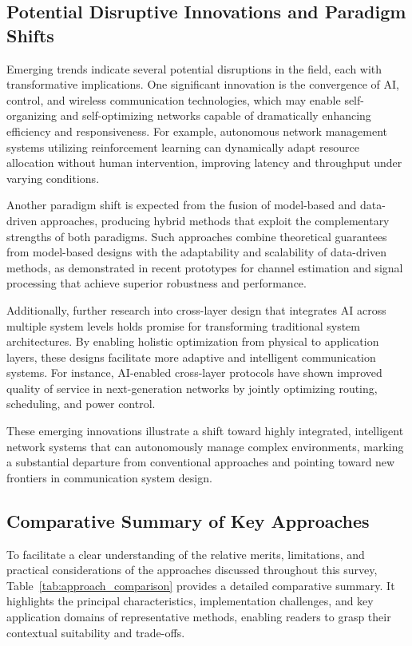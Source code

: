 \documentclass[sigconf]{acmart}
\begin{document}
\subsection{Potential Disruptive Innovations and Paradigm Shifts}

Emerging trends indicate several potential disruptions in the field, each with transformative implications. One significant innovation is the convergence of AI, control, and wireless communication technologies, which may enable self-organizing and self-optimizing networks capable of dramatically enhancing efficiency and responsiveness. For example, autonomous network management systems utilizing reinforcement learning can dynamically adapt resource allocation without human intervention, improving latency and throughput under varying conditions.

Another paradigm shift is expected from the fusion of model-based and data-driven approaches, producing hybrid methods that exploit the complementary strengths of both paradigms. Such approaches combine theoretical guarantees from model-based designs with the adaptability and scalability of data-driven methods, as demonstrated in recent prototypes for channel estimation and signal processing that achieve superior robustness and performance.

Additionally, further research into cross-layer design that integrates AI across multiple system levels holds promise for transforming traditional system architectures. By enabling holistic optimization from physical to application layers, these designs facilitate more adaptive and intelligent communication systems. For instance, AI-enabled cross-layer protocols have shown improved quality of service in next-generation networks by jointly optimizing routing, scheduling, and power control.

These emerging innovations illustrate a shift toward highly integrated, intelligent network systems that can autonomously manage complex environments, marking a substantial departure from conventional approaches and pointing toward new frontiers in communication system design.

\subsection{Comparative Summary of Key Approaches}

To facilitate a clear understanding of the relative merits, limitations, and practical considerations of the approaches discussed throughout this survey, Table~\ref{tab:approach_comparison} provides a detailed comparative summary. It highlights the principal characteristics, implementation challenges, and key application domains of representative methods, enabling readers to grasp their contextual suitability and trade-offs.
\end{document}
